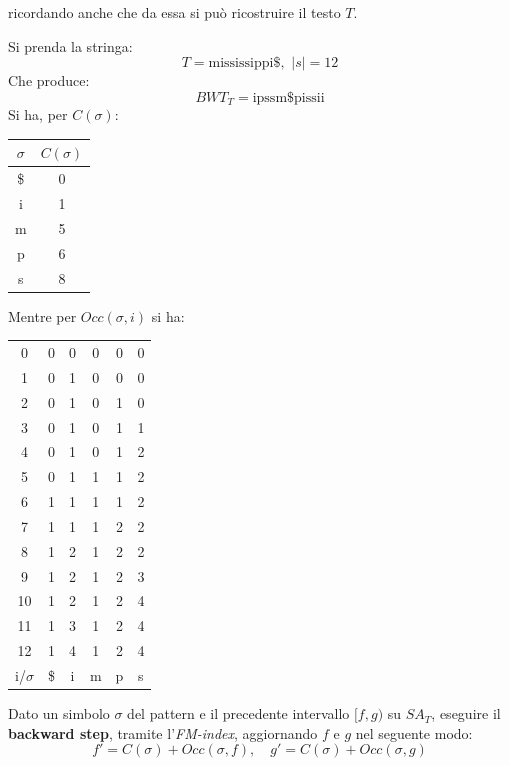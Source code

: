 ricordando anche che da essa si può ricostruire il testo $T$.
\begin{esempio}
  Si prenda la stringa:
  \[T=\mbox{mississippi\$},\,\,|s|=12\]
  Che produce:
  \[BWT_T=\mbox{ipssm\$pissii}\]
  Si ha, per $C(\sigma)$:
  \begin{table}[H]
    \centering
    \begin{tabular}{c|c}
      $\sigma$ & $C(\sigma)$\\
      \hline
      \hline
      \$ & 0\\
      i & 1 \\
      m & 5\\
      p & 6\\
      s & 8\\
    \end{tabular}
  \end{table}
  Mentre per $Occ(\sigma, i)$ si ha:
  \begin{table}[H]
    \centering
    \begin{tabular}{c|c|c|c|c|c}
      0 & 0 & 0 & 0 & 0 & 0 \\
      1 & 0 & 1 & 0 & 0 & 0 \\
      2 & 0 & 1 & 0 & 1 & 0 \\
      3 & 0 & 1 & 0 & 1 & 1 \\
      4 & 0 & 1 & 0 & 1 & 2 \\
      5 & 0 & 1 & 1 & 1 & 2 \\
      6 & 1 & 1 & 1 & 1 & 2 \\
      7 & 1 & 1 & 1 & 2 & 2 \\
      8 & 1 & 2 & 1 & 2 & 2 \\
      9 & 1 & 2 & 1 & 2 & 3 \\
      10 & 1 & 2 & 1 & 2 & 4 \\
      11 & 1 & 3 & 1 & 2 & 4 \\
      12 & 1 & 4 & 1 & 2 & 4 \\
      \hline
      \hline
      i/$\sigma$ & \$ & i & m & p & s
    \end{tabular}
  \end{table}
\end{esempio}
Dato un simbolo $\sigma$ del pattern e il precedente intervallo $[f,g)$ su
$SA_T$, eseguire il \textbf{backward step}, tramite l'\textit{FM-index},
aggiornando $f$ e $g$ nel seguente modo: 
\begin{equation}
  \label{eq:bwt6}
  f'=C(\sigma)+Occ(\sigma, f),\quad g'=C(\sigma)+Occ(\sigma, g)
\end{equation}
